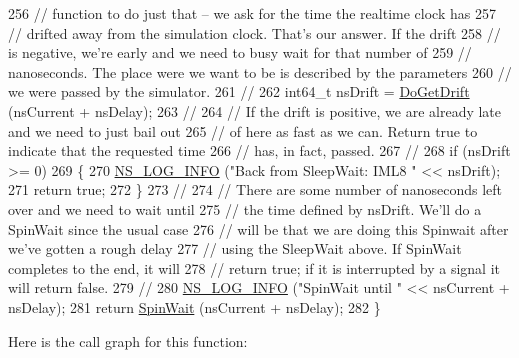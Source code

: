 \begin{DoxyCode}
256 \textcolor{comment}{// function to do just that -- we ask for the time the realtime clock has}
257 \textcolor{comment}{// drifted away from the simulation clock.  That's our answer.  If the drift}
258 \textcolor{comment}{// is negative, we're early and we need to busy wait for that number of }
259 \textcolor{comment}{// nanoseconds.  The place were we want to be is described by the parameters}
260 \textcolor{comment}{// we were passed by the simulator.}
261 \textcolor{comment}{//}
262   int64\_t nsDrift = \hyperlink{classns3_1_1WallClockSynchronizer_a8f7eb1d2c3fd95183d566f8aa67a4282}{DoGetDrift} (nsCurrent + nsDelay);
263 \textcolor{comment}{//}
264 \textcolor{comment}{// If the drift is positive, we are already late and we need to just bail out}
265 \textcolor{comment}{// of here as fast as we can.  Return true to indicate that the requested time}
266 \textcolor{comment}{// has, in fact, passed.}
267 \textcolor{comment}{//}
268   \textcolor{keywordflow}{if} (nsDrift >= 0)
269     \{
270       \hyperlink{group__logging_gafbd73ee2cf9f26b319f49086d8e860fb}{NS\_LOG\_INFO} (\textcolor{stringliteral}{"Back from SleepWait: IML8 "} << nsDrift);
271       \textcolor{keywordflow}{return} \textcolor{keyword}{true};
272     \}
273 \textcolor{comment}{//}
274 \textcolor{comment}{// There are some number of nanoseconds left over and we need to wait until}
275 \textcolor{comment}{// the time defined by nsDrift.  We'll do a SpinWait since the usual case }
276 \textcolor{comment}{// will be that we are doing this Spinwait after we've gotten a rough delay}
277 \textcolor{comment}{// using the SleepWait above.  If SpinWait completes to the end, it will }
278 \textcolor{comment}{// return true; if it is interrupted by a signal it will return false.}
279 \textcolor{comment}{//}
280   \hyperlink{group__logging_gafbd73ee2cf9f26b319f49086d8e860fb}{NS\_LOG\_INFO} (\textcolor{stringliteral}{"SpinWait until "} << nsCurrent + nsDelay);
281   \textcolor{keywordflow}{return} \hyperlink{classns3_1_1WallClockSynchronizer_aa236882980f6c82e0e7f716e670e5c1f}{SpinWait} (nsCurrent + nsDelay);
282 \}
\end{DoxyCode}


Here is the call graph for this function\+:


